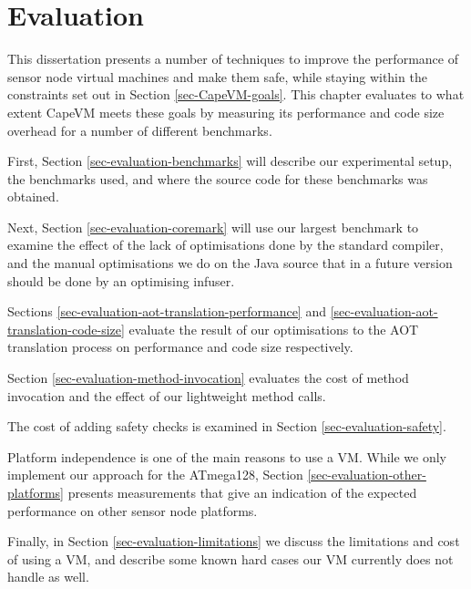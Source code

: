 \chapter{Evaluation}
\label{sec-evaluation}
This dissertation presents a number of techniques to improve the performance of sensor node virtual machines and make them safe, while staying within the constraints set out in Section \ref{sec-CapeVM-goals}. This chapter evaluates to what extent CapeVM meets these goals by measuring its performance and code size overhead for a number of different benchmarks.

First, Section \ref{sec-evaluation-benchmarks} will describe our experimental setup, the benchmarks used, and where the source code for these benchmarks was obtained.

Next, Section \ref{sec-evaluation-coremark} will use our largest benchmark to examine the effect of the lack of optimisations done by the standard  compiler, and the manual optimisations we do on the Java source that in a future version should be done by an optimising infuser.

Sections \ref{sec-evaluation-aot-translation-performance} and \ref{sec-evaluation-aot-translation-code-size} evaluate the result of our optimisations to the AOT translation process on performance and code size respectively.

Section \ref{sec-evaluation-method-invocation} evaluates the cost of method invocation and the effect of our lightweight method calls.

The cost of adding safety checks is examined in Section \ref{sec-evaluation-safety}.

Platform independence is one of the main reasons to use a VM. While we only implement our approach for the ATmega128, Section \ref{sec-evaluation-other-platforms} presents measurements that give an indication of the expected performance on other sensor node platforms.

Finally, in Section \ref{sec-evaluation-limitations} we discuss the limitations and cost of using a VM, and describe some known hard cases our VM currently does not handle as well.
